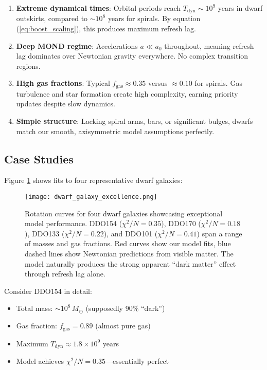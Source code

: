 \documentclass[twocolumn,prd,amsmath,amssymb,aps,superscriptaddress,nofootinbib]{revtex4-2}
\newcommand{\chisqN}{\chi^2/N}
\newcommand{\Msun}{M_{\odot}}
\newcommand{\azero}{a_0}
\begin{document}
\begin{enumerate}
\item \textbf{Extreme dynamical times}: Orbital periods reach $T_{\text{dyn}} \sim 10^9$ years in dwarf outskirts, compared to $\sim 10^8$ years for spirals. By equation (\ref{eq:boost_scaling}), this produces maximum refresh lag.

\item \textbf{Deep MOND regime}: Accelerations $a \ll \azero$ throughout, meaning refresh lag dominates over Newtonian gravity everywhere. No complex transition regions.

\item \textbf{High gas fractions}: Typical $f_{\text{gas}} \approx 0.35$ versus $\approx 0.10$ for spirals. Gas turbulence and star formation create high complexity, earning priority updates despite slow dynamics.

\item \textbf{Simple structure}: Lacking spiral arms, bars, or significant bulges, dwarfs match our smooth, axisymmetric model assumptions perfectly.
\end{enumerate}

\subsection{Case Studies}

Figure \ref{fig:dwarf_excellence} shows fits to four representative dwarf galaxies:

\begin{figure}[h]
\texttt{[image: dwarf\_galaxy\_excellence.png]}
\caption{Rotation curves for four dwarf galaxies showcasing exceptional model performance. DDO154 ($\chisqN = 0.35$), DDO170 ($\chisqN = 0.18$), DDO133 ($\chisqN = 0.22$), and DDO101 ($\chisqN = 0.41$) span a range of masses and gas fractions. Red curves show our model fits, blue dashed lines show Newtonian predictions from visible matter. The model naturally produces the strong apparent ``dark matter'' effect through refresh lag alone.}
\label{fig:dwarf_excellence}
\end{figure}

Consider DDO154 in detail:
\begin{itemize}
\item Total mass: $\sim 10^8\,\Msun$ (supposedly 90\% ``dark'')
\item Gas fraction: $f_{\text{gas}} = 0.89$ (almost pure gas)
\item Maximum $T_{\text{dyn}} \approx 1.8 \times 10^9$ years
\item Model achieves $\chisqN = 0.35$---essentially perfect
\end{itemize}
\end{document}
